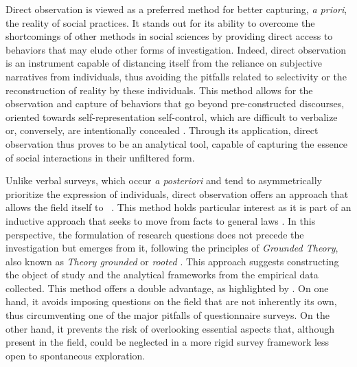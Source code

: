 \begin{refsegment}
Direct observation is viewed as a preferred method for better capturing, \textsl{a priori}, the reality of social practices. It stands out for its ability to overcome the shortcomings of other methods in social sciences by providing direct access to behaviors that may elude other forms of investigation. Indeed, direct observation is an instrument capable of distancing itself from the reliance on subjective narratives from individuals, thus avoiding the pitfalls related to selectivity or the reconstruction of reality by these individuals. This method allows for the observation and capture of behaviors that go beyond pre-constructed discourses, oriented towards self-representation self-control, which are difficult to verbalize or, conversely, are intentionally concealed \textcolor{blue}{\autocite[26]{arborio_observation_2007}}. Through its application, direct observation thus proves to be an analytical tool, capable of capturing the essence of social interactions in their unfiltered form. %

Unlike verbal surveys, which occur \textsl{a posteriori} and tend to asymmetrically prioritize the expression of individuals, direct observation offers an approach that allows the field itself to ~\textcolor{blue}{\autocite[101]{cochoy_mort_2013}}. This method holds particular interest as it is part of an inductive approach that seeks to move from facts to general laws \textcolor{blue}{\autocite[28]{arborio_observation_2007}}. In this perspective, the formulation of research questions does not precede the investigation but emerges from it, following the principles of \textsl{Grounded Theory}, also known as \textsl{Theory grounded} or \textsl{rooted} \textcolor{blue}{\autocite[144]{joannides_grounded_2008}}. This approach suggests constructing the object of study and the analytical frameworks from the empirical data collected. This method offers a double advantage, as highlighted by \textcolor{blue}{\textcite[101]{cochoy_mort_2013}}. On one hand, it avoids imposing questions on the field that are not inherently its own, thus circumventing one of the major pitfalls of questionnaire surveys. On the other hand, it prevents the risk of overlooking essential aspects that, although present in the field, could be neglected in a more rigid survey framework less open to spontaneous exploration.%


\end{refsegment}

